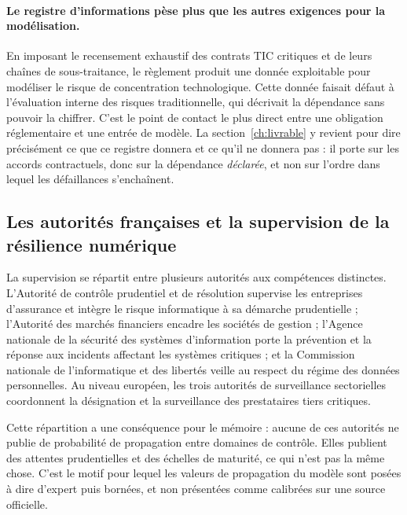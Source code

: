 \paragraph{Le registre d'informations pèse plus que les autres exigences pour la modélisation.}
En imposant le recensement exhaustif des contrats TIC critiques et de leurs chaînes de
sous-traitance, le règlement produit une donnée exploitable pour modéliser le risque de
concentration technologique. Cette donnée faisait défaut à l'évaluation interne des risques
traditionnelle, qui décrivait la dépendance sans pouvoir la chiffrer. C'est le point de contact
le plus direct entre une obligation réglementaire et une entrée de modèle. La
section~\ref{ch:livrable} y revient pour dire précisément ce que ce registre donnera et ce
qu'il ne donnera pas : il porte sur les accords contractuels, donc sur la dépendance
\emph{déclarée}, et non sur l'ordre dans lequel les défaillances s'enchaînent.

\subsection{Les autorités françaises et la supervision de la résilience numérique}
\label{subsec:supervision-france}

La supervision se répartit entre plusieurs autorités aux compétences distinctes. L'Autorité de
contrôle prudentiel et de résolution supervise les entreprises d'assurance et intègre le risque
informatique à sa démarche prudentielle ; l'Autorité des marchés financiers encadre les sociétés
de gestion ; l'Agence nationale de la sécurité des systèmes d'information porte la prévention et
la réponse aux incidents affectant les systèmes critiques ; et la Commission nationale de
l'informatique et des libertés veille au respect du régime des données personnelles. Au niveau
européen, les trois autorités de surveillance sectorielles coordonnent la désignation et la
surveillance des prestataires tiers critiques.

Cette répartition a une conséquence pour le mémoire : aucune de ces autorités ne publie de
probabilité de propagation entre domaines de contrôle. Elles publient des attentes prudentielles
et des échelles de maturité, ce qui n'est pas la même chose. C'est le motif pour lequel les
valeurs de propagation du modèle sont posées à dire d'expert puis bornées, et non présentées
comme calibrées sur une source officielle.


